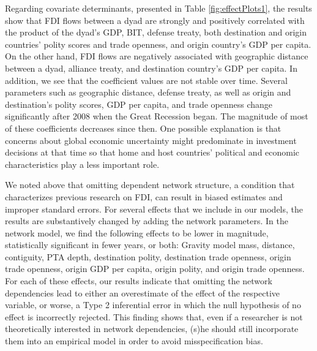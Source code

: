 \documentclass[reqno,onecolumn,letterpaper,12pt]{article}
\begin{document}
Regarding covariate determinants, presented in Table \ref{fig:effectPlots1}, the results show that FDI flows between a dyad are strongly and positively correlated with the product of the dyad's GDP, BIT, defense treaty, both destination and origin countries' polity scores and trade openness, and origin country's GDP per capita. On the other hand, FDI flows are negatively associated with geographic distance between a dyad, alliance treaty, and destination country's GDP per capita. In addition, we see that the coefficient values are not stable over time. Several parameters such as geographic distance, defense treaty, as well as origin and destination's polity scores, GDP per capita, and trade openness change significantly after 2008 when the Great Recession began. The magnitude of most of these coefficients decreases since then. One possible explanation is that concerns about global economic uncertainty might predominate in investment decisions at that time so that home and host countries' political and economic characteristics play a less important role.

We noted above that omitting dependent network structure, a condition that characterizes previous research on FDI, can result in biased estimates and improper standard errors. For several effects that we include in our models, the results are substantively changed by adding the network parameters. In the network model, we find the following effects to be lower in magnitude, statistically significant in fewer years, or both: Gravity model mass, distance, contiguity, PTA depth, destination polity, destination trade openness, origin trade openness, origin GDP per capita, origin polity, and origin trade openness. For each of these effects, our results indicate that omitting the network dependencies lead to either an overestimate of the effect of the respective variable, or worse, a Type 2 inferential error in which the null hypothesis of no effect is incorrectly rejected. This finding shows that, even if a researcher is not theoretically interested in network dependencies, (s)he should still incorporate them into an empirical model in order to avoid misspecification bias.
\end{document}
